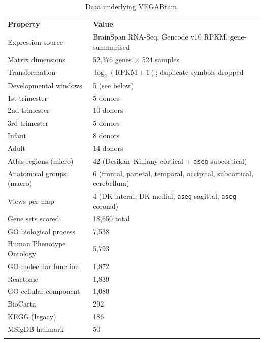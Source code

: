 \documentclass[pdflatex,sn-basic]{sn-jnl}
\begin{document}
\begin{table}[htbp]
\centering
\caption{Data underlying VEGABrain.}\label{tab:data}
\begin{tabular}{@{}ll@{}}
\toprule
Property & Value \\
\midrule
Expression source        & BrainSpan RNA-Seq, Gencode v10 RPKM, gene-summarised \\
Matrix dimensions        & 52{,}376 genes $\times$ 524 samples \\
Transformation           & $\log_2(\mathrm{RPKM}+1)$; duplicate symbols dropped \\
Developmental windows    & 5 (see below) \\
\quad 1st trimester      & 5 donors \\
\quad 2nd trimester      & 10 donors \\
\quad 3rd trimester      & 5 donors \\
\quad Infant             & 8 donors \\
\quad Adult              & 14 donors \\
Atlas regions (micro)    & 42 (Desikan--Killiany cortical + \texttt{aseg} subcortical) \\
Anatomical groups (macro)& 6 (frontal, parietal, temporal, occipital, subcortical, cerebellum) \\
Views per map            & 4 (DK lateral, DK medial, \texttt{aseg} sagittal, \texttt{aseg} coronal) \\
Gene sets scored         & 18{,}650 total \\
\quad GO biological process & 7{,}538 \\
\quad Human Phenotype Ontology & 5{,}793 \\
\quad GO molecular function & 1{,}872 \\
\quad Reactome           & 1{,}839 \\
\quad GO cellular component & 1{,}080 \\
\quad BioCarta           & 292 \\
\quad KEGG (legacy)      & 186 \\
\quad MSigDB hallmark    & 50 \\
\botrule
\end{tabular}
\end{table}

\end{document}
